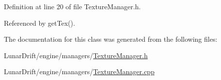 Definition at line 20 of file Texture\+Manager.\+h.



Referenced by get\+Tex().



The documentation for this class was generated from the following files\+:\begin{DoxyCompactItemize}
\item 
Lunar\+Drift/engine/managers/\hyperlink{_texture_manager_8h}{Texture\+Manager.\+h}\item 
Lunar\+Drift/engine/managers/\hyperlink{_texture_manager_8cpp}{Texture\+Manager.\+cpp}\end{DoxyCompactItemize}
